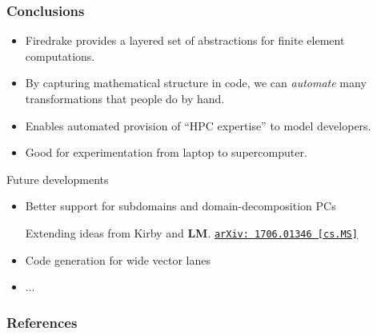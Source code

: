 \documentclass[presentation]{beamer}
\newcommand{\arxivlink}[2]{%
  \href{http://www.arxiv.org/abs/#1}%
  {\texttt{arXiv:\,#1\,[#2]}}%
}
\begin{document}
\begin{frame}[fragile]
\begin{columns}
\begin{column}{0.6\textwidth}
\begin{center}
  \end{center}    
  \end{column}
  \end{columns}
\end{frame}

\begin{frame}
  \frametitle{Conclusions}
  \begin{itemize}
  \item Firedrake provides a layered set of abstractions for finite
    element computations.
  \item By capturing mathematical structure in code, we can
    \emph{automate} many transformations that people do by hand.
  \item Enables automated provision of ``HPC expertise'' to model
    developers.
  \item Good for experimentation from laptop to supercomputer.
  \end{itemize}
  \begin{block}{Future developments}
    \begin{itemize}
    \item Better support for subdomains and domain-decomposition PCs
      \begin{flushright}
        {\scriptsize
          Extending ideas from Kirby and \textbf{LM}. \arxivlink{1706.01346}{cs.MS}\nocite{Kirby:2017}}
      \end{flushright}
    \item Code generation for wide vector lanes
    \item ...
    \end{itemize}
  \end{block}
\end{frame}

\appendix
\begin{frame}
  \frametitle{References}
  \printbibliography[heading=none]
\end{frame}
\end{document}
